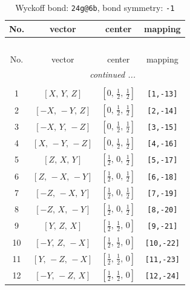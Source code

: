 \documentclass[fleqn,8pt]{jsarticle}
\begin{document}
\begin{longtable}{cccc}
\caption{Wyckoff bond: {\tt 24g@6b}, bond symmetry: {\tt -1}}
 \\
 \hline \hline
No. & vector & center & mapping \\ \hline \endfirsthead

\multicolumn{3}{l}{\tablename\ \thetable{}} \\
 \hline \hline
No. & vector & center & mapping \\ \hline \endhead

 \hline \hline
\multicolumn{3}{r}{\footnotesize\it continued ...} \\ \endfoot

 \hline \hline
\multicolumn{3}{r}{} \\ \endlastfoot

1 & $\left[ X,\, Y,\, Z \right]$ & $\left[ 0,\, \frac{1}{2},\, \frac{1}{2} \right]$ & {\tt [1,-13]} \\ \hline
2 & $\left[ - X,\, - Y,\, Z \right]$ & $\left[ 0,\, \frac{1}{2},\, \frac{1}{2} \right]$ & {\tt [2,-14]} \\ \hline
3 & $\left[ - X,\, Y,\, - Z \right]$ & $\left[ 0,\, \frac{1}{2},\, \frac{1}{2} \right]$ & {\tt [3,-15]} \\ \hline
4 & $\left[ X,\, - Y,\, - Z \right]$ & $\left[ 0,\, \frac{1}{2},\, \frac{1}{2} \right]$ & {\tt [4,-16]} \\ \hline
5 & $\left[ Z,\, X,\, Y \right]$ & $\left[ \frac{1}{2},\, 0,\, \frac{1}{2} \right]$ & {\tt [5,-17]} \\ \hline
6 & $\left[ Z,\, - X,\, - Y \right]$ & $\left[ \frac{1}{2},\, 0,\, \frac{1}{2} \right]$ & {\tt [6,-18]} \\ \hline
7 & $\left[ - Z,\, - X,\, Y \right]$ & $\left[ \frac{1}{2},\, 0,\, \frac{1}{2} \right]$ & {\tt [7,-19]} \\ \hline
8 & $\left[ - Z,\, X,\, - Y \right]$ & $\left[ \frac{1}{2},\, 0,\, \frac{1}{2} \right]$ & {\tt [8,-20]} \\ \hline
9 & $\left[ Y,\, Z,\, X \right]$ & $\left[ \frac{1}{2},\, \frac{1}{2},\, 0 \right]$ & {\tt [9,-21]} \\ \hline
10 & $\left[ - Y,\, Z,\, - X \right]$ & $\left[ \frac{1}{2},\, \frac{1}{2},\, 0 \right]$ & {\tt [10,-22]} \\ \hline
11 & $\left[ Y,\, - Z,\, - X \right]$ & $\left[ \frac{1}{2},\, \frac{1}{2},\, 0 \right]$ & {\tt [11,-23]} \\ \hline
12 & $\left[ - Y,\, - Z,\, X \right]$ & $\left[ \frac{1}{2},\, \frac{1}{2},\, 0 \right]$ & {\tt [12,-24]} \\
\end{longtable}
\end{document}
